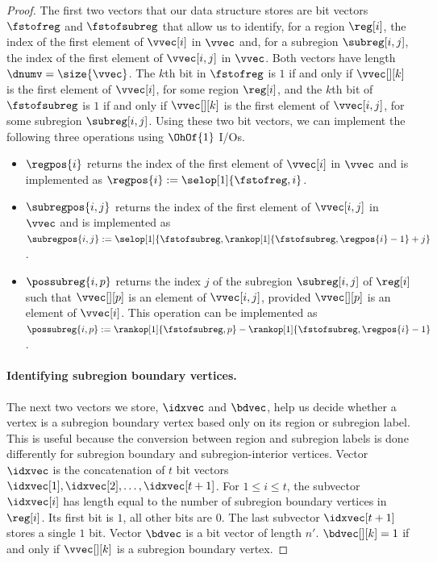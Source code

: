 {\begin{proof}
  The first two vectors that our data structure stores are bit vectors
  $\fstofreg$ and $\fstofsubreg$ that
  allow us to identify, for a region $\reg[i]$, the index of the first
  element of $\vvec[i]$ in $\vvec$ and, for a subregion $\subreg[i,j]$,
  the index of the first element of $\vvec[i,j]$ in $\vvec$.
  Both vectors have length $\dnumv = \size{\vvec}$.
  The $k$th bit in $\fstofreg$ is $1$ if and only if $\vvec[][k]$ is the
  first element of $\vvec[i]$, for some region $\reg[i]$,
  and the $k$th bit of $\fstofsubreg$ is $1$
  if and only if $\vvec[][k]$ is the first element of $\vvec[i,j]$, for some
  subregion $\subreg[i,j]$.
  Using these two bit vectors, we can implement the following three operations
  using $\OhOf{1}$ I/Os.
  \begin{itemize}
  \item $\regpos{i}$ returns the index of the first element of $\vvec[i]$
    in $\vvec$ and is implemented as $\regpos{i} := \selop[1]{\fstofreg,i}$.
  \item $\subregpos{i,j}$ returns the index of the first element of $\vvec[i,j]$
    in $\vvec$ and is implemented as\\
    $\subregpos{i,j} := \selop[1]{\fstofsubreg,\rankop[1]{\fstofsubreg,\regpos{i}-1}+j}$.
  \item $\possubreg{i,p}$ returns the index $j$ of the subregion $\subreg[i,j]$
    of $\reg[i]$ such that $\vvec[][p]$ is an element of  $\vvec[i,j]$,
    provided $\vvec[][p]$ is an element of $\vvec[i]$.
    This operation can be implemented as
    $\possubreg{i,p} := \rankop[1]{\fstofsubreg,p} - \rankop[1]{\fstofsubreg,
      \regpos{i} - 1}$.
  \end{itemize}

  \paragraph{Identifying subregion boundary vertices.}

  The next two vectors we store, $\idxvec$ and $\bdvec$, help us decide whether
  a vertex is a subregion boundary vertex based only on its region or subregion
  label.
  This is useful because the conversion between region and subregion
  labels is done differently for subregion boundary and subregion-interior
  vertices.
  Vector $\idxvec$ is the concatenation of $t$ bit vectors
  $\idxvec[1], \idxvec[2], \dots, \idxvec[t+1]$.
  For $1 \le i \le t$, the subvector $\idxvec[i]$ has length equal to the
  number of subregion boundary vertices in $\reg[i]$.
  Its first bit is $1$, all other bits are $0$.
  The last subvector $\idxvec[t+1]$ stores a single $1$ bit.
  Vector $\bdvec$ is a bit vector of length $n'$.
  $\bdvec[][k] = 1$ if and only if $\vvec[][k]$ is a subregion boundary
  vertex.


\end{proof}}
